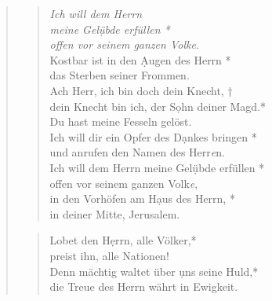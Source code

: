 \begin{quote}
\begin{verse}
\vin \textit{Ich will dem Herrn\\ 
\vin meine Gel\d übde erfüllen *\\ 
\vin offen vor seinem ganzen Volke.}\\ 
Kostbar ist in den \d Augen des Herrn *\\ 
das Sterben seiner Frommen.\\ 
\vin Ach Herr, ich bin doch dein Knecht, †\\ 
\vin dein Knecht bin ich, der S\d ohn deiner Magd.*\\ 
\vin Du hast meine Fesseln gelöst.\\ 
Ich will dir ein Opfer des D\d ankes bringen *\\ 
und anrufen den Namen des Herr\textit{e}n.\\ 
\vin Ich will dem Herrn meine Gel\d übde erfüllen *\\ 
\vin offen vor seinem ganzen Volk\textit{e}, \\
in den Vorhöfen am H\d aus des Herrn, *\\ 
in deiner Mitte, Jerusalem.\\ 

\end{verse}

\vspace{0.5cm}


\begin{verse}
 Lobet den H\d errn, alle Völker,*\\
preist ihn, alle Nationen! \\
\vin Denn mächtig waltet über \d uns seine Huld,*\\
\vin die Treue des Herrn währt in Ewigkeit. \\
\end{verse}

\end{quote}

\vspace{0.5cm}

\def\greinitialformat#1{{\fontsize{40}{40}\selectfont #1}}
\gresetfirstlineaboveinitial{\small \textcolor{red}{Ps 137}}{}
\setaboveinitialseparation{0.72mm}

\vspace{0.5cm}


